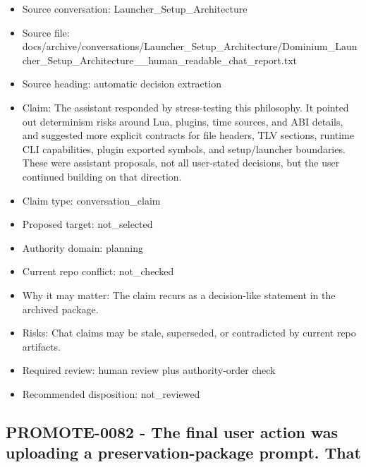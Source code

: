 \documentclass[11pt,a4paper]{report}
\begin{document}
\begin{itemize}
\item Source conversation: Launcher\_Setup\_Architecture
\item Source file: docs/archive/conversations/Launcher\_Setup\_Architecture/Dominium\_Launcher\_Setup\_Architecture\_\_human\_readable\_chat\_report.txt
\item Source heading: automatic decision extraction
\item Claim: The assistant responded by stress-testing this philosophy. It pointed out determinism risks around Lua, plugins, time sources, and ABI details, and suggested more explicit contracts for file headers, TLV sections, runtime CLI capabilities, plugin exported symbols, and setup/launcher boundaries. These were assistant proposals, not all user-stated decisions, but the user continued building on that direction.
\item Claim type: conversation\_claim
\item Proposed target: not\_selected
\item Authority domain: planning
\item Current repo conflict: not\_checked
\item Why it may matter: The claim recurs as a decision-like statement in the archived package.
\item Risks: Chat claims may be stale, superseded, or contradicted by current repo artifacts.
\item Required review: human review plus authority-order check
\item Recommended disposition: not\_reviewed
\end{itemize}

\subsection{PROMOTE-0082 - The final user action was uploading a preservation-package prompt. That}
\end{document}
